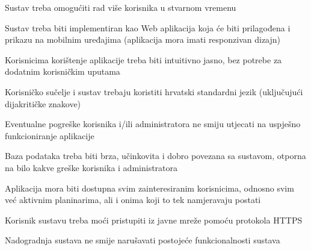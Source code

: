 		 
			 	\begin{packed_item}
			 	
			 	\item  $ $Sustav treba omogućiti rad više korisnika u stvarnom vremenu $ $
			 	\item  $ $Sustav treba biti implementiran kao Web aplikacija koja će biti prilagođena i prikazu na mobilnim uređajima (aplikacija mora imati responzivan dizajn) $ $
			 	\item  $ $Korisnicima korištenje aplikacije treba biti intuitivno jasno, bez potrebe za dodatnim korisničkim uputama$ $
			 	\item  $ $Korisničko sučelje i sustav trebaju koristiti hrvatski standardni jezik (uključujući dijakritičke znakove)$ $
			 	\item  $ $Eventualne pogreške korisnika i/ili administratora ne smiju utjecati na uspješno funkcioniranje aplikacije$ $
			 	\item  $ $Baza podataka treba biti brza, učinkovita i dobro povezana sa sustavom, otporna na bilo kakve greške korisnika i administratora $ $
			 	
			 	\item  $ $Aplikacija mora biti dostupna svim zainteresiranim korisnicima, odnosno svim već aktivnim planinarima, ali i onima koji to tek namjeravaju postati$ $
			 	\item  $ $Korisnik sustavu treba moći pristupiti iz javne mreže pomoću protokola HTTPS $ $
			 	\item  $ $Nadogradnja sustava ne smije narušavati postojeće funkcionalnosti sustava$ $
			 	
			 
			 \end{packed_item}
			 
			 \eject
			 
	